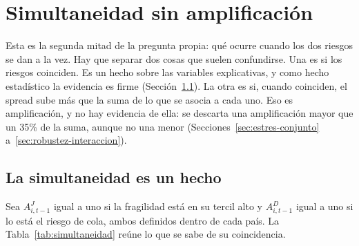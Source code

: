 \section{Simultaneidad sin amplificación}
\label{sec:aditivos}

Esta es la segunda mitad de la pregunta propia: qué ocurre cuando los dos riesgos se dan a la vez. Hay que separar dos cosas que suelen confundirse. Una es si los riesgos coinciden. Es un hecho sobre las variables explicativas, y como hecho estadístico la evidencia es firme (Sección~\ref{sec:simultaneidad}). La otra es si, cuando coinciden, el spread sube más que la suma de lo que se asocia a cada uno. Eso es amplificación, y no hay evidencia de ella: se descarta una amplificación mayor que un 35\% de la suma, aunque no una menor (Secciones~\ref{sec:estres-conjunto} a~\ref{sec:robustez-interaccion}).

\subsection{La simultaneidad es un hecho}
\label{sec:simultaneidad}

Sea $A^{J}_{i,t-1}$ igual a uno si la fragilidad está en su tercil alto y $A^{D}_{i,t-1}$ igual a uno si lo está el riesgo de cola, ambos definidos dentro de cada país. La Tabla~\ref{tab:simultaneidad} reúne lo que se sabe de su coincidencia.

